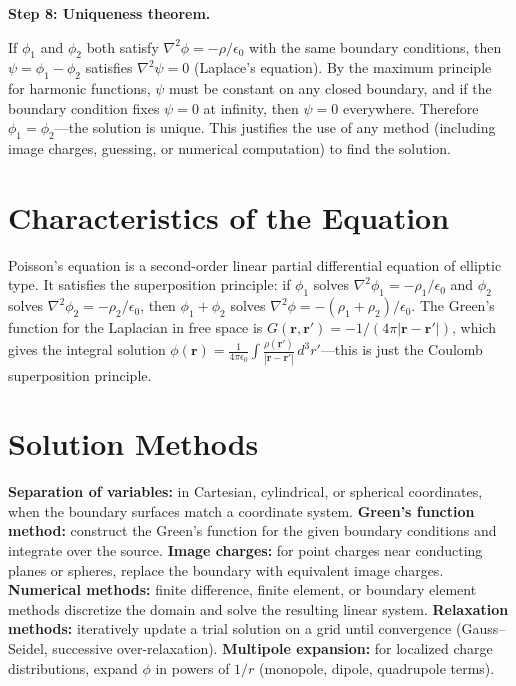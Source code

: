 \textbf{Step 8: Uniqueness theorem.}

If $\phi_1$ and $\phi_2$ both satisfy $\nabla^2\phi = -\rho/\epsilon_0$ with the same boundary conditions, then $\psi = \phi_1 - \phi_2$ satisfies $\nabla^2\psi = 0$ (Laplace's equation). By the maximum principle for harmonic functions, $\psi$ must be constant on any closed boundary, and if the boundary condition fixes $\psi = 0$ at infinity, then $\psi = 0$ everywhere. Therefore $\phi_1 = \phi_2$---the solution is unique. This justifies the use of any method (including image charges, guessing, or numerical computation) to find the solution.

\section*{Characteristics of the Equation}

Poisson's equation is a second-order linear partial differential equation of elliptic type. It satisfies the superposition principle: if $\phi_1$ solves $\nabla^2\phi_1 = -\rho_1/\epsilon_0$ and $\phi_2$ solves $\nabla^2\phi_2 = -\rho_2/\epsilon_0$, then $\phi_1 + \phi_2$ solves $\nabla^2\phi = -(\rho_1 + \rho_2)/\epsilon_0$. The Green's function for the Laplacian in free space is $G(\mathbf{r}, \mathbf{r}') = -1/(4\pi|\mathbf{r} - \mathbf{r}'|)$, which gives the integral solution $\phi(\mathbf{r}) = \frac{1}{4\pi\epsilon_0}\int\frac{\rho(\mathbf{r}')}{|\mathbf{r} - \mathbf{r}'|}\,d^3r'$---this is just the Coulomb superposition principle.
\section*{Solution Methods}

\textbf{Separation of variables:} in Cartesian, cylindrical, or spherical coordinates, when the boundary surfaces match a coordinate system. \textbf{Green's function method:} construct the Green's function for the given boundary conditions and integrate over the source. \textbf{Image charges:} for point charges near conducting planes or spheres, replace the boundary with equivalent image charges. \textbf{Numerical methods:} finite difference, finite element, or boundary element methods discretize the domain and solve the resulting linear system. \textbf{Relaxation methods:} iteratively update a trial solution on a grid until convergence (Gauss--Seidel, successive over-relaxation). \textbf{Multipole expansion:} for localized charge distributions, expand $\phi$ in powers of $1/r$ (monopole, dipole, quadrupole terms).
